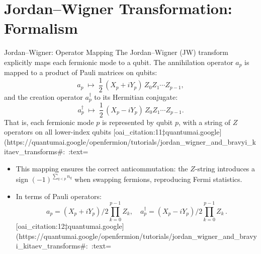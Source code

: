 \documentclass{beamer}
\begin{document}
\section{Jordan–Wigner Transformation: Formalism}
\begin{frame}{Jordan–Wigner: Operator Mapping}
The Jordan–Wigner (JW) transform explicitly maps each fermionic mode to a qubit.  The annihilation operator $a_p$ is mapped to a product of Pauli matrices on qubits:
\[
a_p \;\mapsto\; \frac{1}{2}\,(X_p + iY_p)\,Z_0 Z_1\cdots Z_{p-1},
\]
and the creation operator $a_p^\dagger$ to its Hermitian conjugate:
\[
a_p^\dagger \;\mapsto\; \frac{1}{2}\,(X_p - iY_p)\,Z_0 Z_1\cdots Z_{p-1}.
\]
That is, each fermionic mode $p$ is represented by qubit $p$, with a string of $Z$ operators on all lower-index qubits [oai_citation:11‡quantumai.google](https://quantumai.google/openfermion/tutorials/jordan_wigner_and_bravyi_kitaev_transforms#:~:text=%
\begin{itemize}
  \item This mapping ensures the correct anticommutation: the $Z$-string introduces a sign $(-1)^{\sum_{q<p}n_q}$ when swapping fermions, reproducing Fermi statistics.
  \item In terms of Pauli operators: 
  \[
    a_p = (X_p + iY_p)/2 \prod_{k=0}^{p-1} Z_k, \quad 
    a_p^\dagger = (X_p - iY_p)/2 \prod_{k=0}^{p-1} Z_k\,. 
  \] [oai_citation:12‡quantumai.google](https://quantumai.google/openfermion/tutorials/jordan_wigner_and_bravyi_kitaev_transforms#:~:text=%
\end{itemize}
\end{frame}
\end{document}
